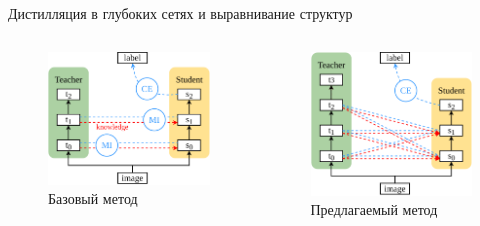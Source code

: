 \documentclass{beamer}
\begin{document}
\begin{frame}{Дистилляция в глубоких сетях и выравнивание структур}

    \begin{columns}[c]
        \begin{figure}
            \includegraphics[width=1.0\textwidth]{ahn_diagram.pdf}
            \caption{Базовый метод}
        \end{figure}

        \begin{figure}
            \includegraphics[width=1.0\textwidth]{our_diagram.pdf}
            \caption{Предлагаемый метод}
        \end{figure}
    \end{columns}


\end{frame}
\end{document}
